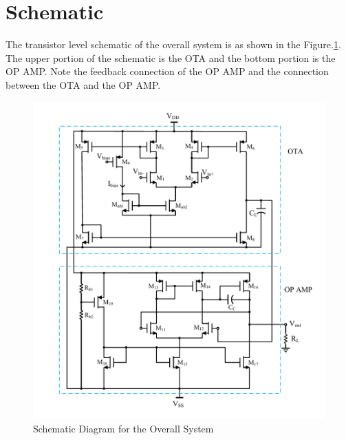 \section{Schematic}
The transistor level schematic of the overall system is as shown in the Figure.\ref{fig:System_Schematic}. The upper portion of the schematic is the OTA and the bottom portion is the OP AMP. Note the feedback connection of the OP AMP and the connection between the OTA and the OP AMP.
\begin{figure} [H]
\centering
\includegraphics[scale=0.95]{Figures/Schematics/OTA_OPAMP_Schematic_RL.pdf}
\caption{Schematic Diagram for the Overall System}
\label{fig:System_Schematic}
\end{figure}

